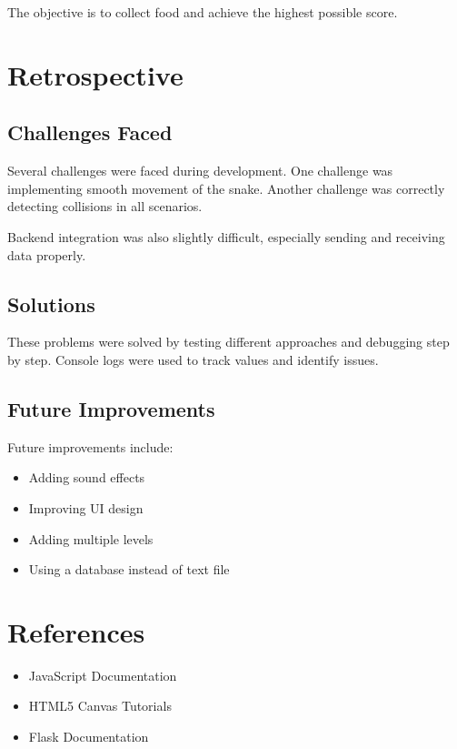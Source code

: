 \documentclass[12pt, a4paper]{article}
\begin{document}
The objective is to collect food and achieve the highest possible score.

\section{Retrospective}

\subsection{Challenges Faced}
Several challenges were faced during development. One challenge was implementing smooth movement of the snake. Another challenge was correctly detecting collisions in all scenarios.

Backend integration was also slightly difficult, especially sending and receiving data properly.

\subsection{Solutions}
These problems were solved by testing different approaches and debugging step by step. Console logs were used to track values and identify issues.

\subsection{Future Improvements}
Future improvements include:
\begin{itemize}
    \item Adding sound effects
    \item Improving UI design
    \item Adding multiple levels
    \item Using a database instead of text file
\end{itemize}

\section{References}

\begin{itemize}
    \item JavaScript Documentation
    \item HTML5 Canvas Tutorials
    \item Flask Documentation
\end{itemize}
\end{document}
